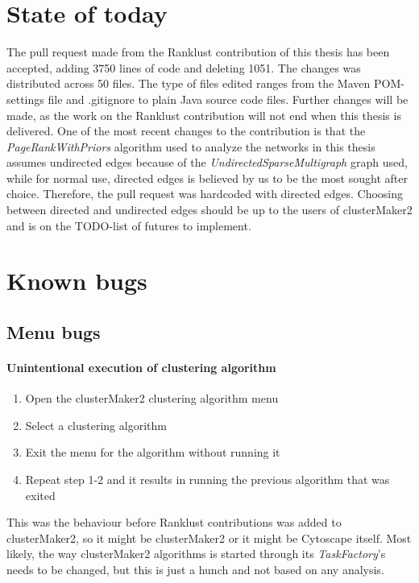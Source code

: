 \section{State of today}
The pull request\cite{git-pull-request} made from the Ranklust
contribution of this thesis has been accepted\cite{ranklust-accepted}, adding
3750 lines of code and deleting 1051. The changes was distributed across 50
files. The type of files edited ranges from the Maven POM-settings file and
.gitignore to plain Java source code files. Further changes will be made, as the
work on the Ranklust contribution will not end when this thesis is delivered.
One of the most recent changes to the contribution is that the
\textit{PageRankWithPriors} algorithm used to analyze the networks in this
thesis assumes undirected edges because of the
\textit{UndirectedSparseMultigraph} graph used, while for normal use, directed
edges is believed by us to be the most sought after choice. Therefore, the pull
request was hardcoded with directed edges. Choosing between directed and
undirected edges should be up to the users of clusterMaker2 and is on the
TODO-list of futures to implement.

\section{Known bugs}
\subsection{Menu bugs}
\paragraph{Unintentional execution of clustering algorithm}
\begin{enumerate}
    \item Open the clusterMaker2 clustering algorithm menu
    \item Select a clustering algorithm
    \item Exit the menu for the algorithm without running it
    \item Repeat step 1-2 and it results in running the previous algorithm that
        was exited
\end{enumerate}
This was the behaviour before Ranklust contributions was added to clusterMaker2,
so it might be clusterMaker2 or it might be Cytoscape itself. Most likely, the
way clusterMaker2 algorithms is started through its \textit{TaskFactory}'s needs
to be changed, but this is just a hunch and not based on any analysis.

